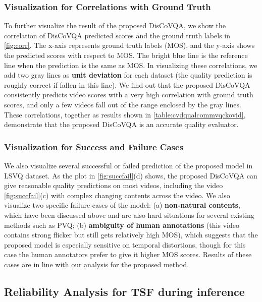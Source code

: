 \documentclass[journal]{IEEEtran}
\begin{document}
\subsubsection{Visualization for Correlations with Ground Truth}




To further visualize the result of the proposed DisCoVQA, we show the correlation of DisCoVQA predicted scores and the ground truth labels in \cref{fig:corr}. The x-axis represents ground truth labels (MOS), and the y-axis shows the predicted scores  with respect to MOS. The bright blue line is the reference line when the prediction is the same as MOS. In visualizing these correlations, we add two gray lines as \textbf{unit deviation} for each dataset (the quality prediction is roughly correct if fallen in this line). We find out that the proposed DisCoVQA consistently predicts video scores with a very high correlation with ground truth scores, and only a few videos fall out of the range enclosed by the gray lines. These correlations, together as results shown in \cref{table:cvdqualcommvqckovid}, demonstrate that the proposed DisCoVQA is an accurate quality evaluator.

\subsubsection{Visualization for Success and Failure Cases}

We also visualize several successful or failed prediction of the proposed model in LSVQ dataset. As the plot in \cref{fig:succfail}(d) shows, the proposed DisCoVQA can give reasonable quality predictions on most videos, including the video \cref{fig:succfail}(c) with complex changing contents across the video. We also visualize two specific failure cases of the model: (a) \textbf{non-natural contents}, which have been discussed above and are also hard situations for several existing methods such as PVQ\cite{pvq}; (b) \textbf{ambiguity of human annotations} (this video contains strong flicker but still gets relatively high MOS), which suggests that the proposed model is especially sensitive on temporal distortions, though for this case the human annotators prefer to give it higher MOS scores. Results of these cases are in line with our analysis for the proposed method.


\subsection{Reliability Analysis for TSF during inference}
\label{sec:rely}
\end{document}
